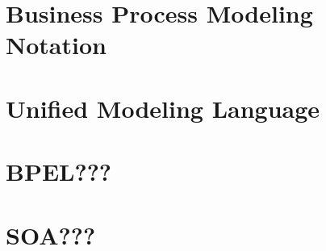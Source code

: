 \section{Business Process Modeling Notation}

\section{Unified Modeling Language}

\section{BPEL???}

\section{SOA???}